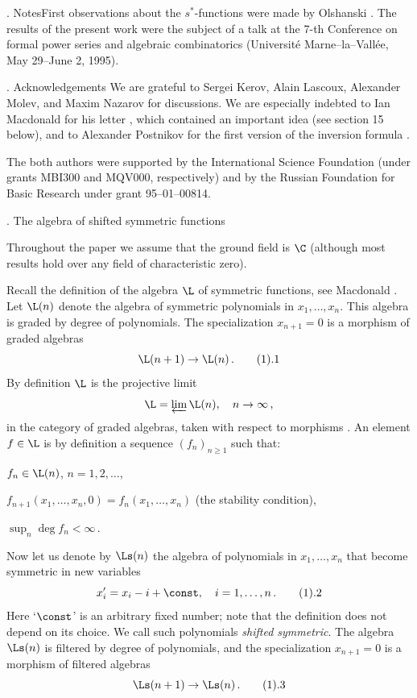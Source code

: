 . Notes\endsubhead  First observations about the
$s^*$-functions were made  by Olshanski \cite{O3}. The 
results of the present work were the
subject of a talk at the 7-th Conference on formal power series and
algebraic combinatorics (Universit\'e Marne--la--Vall\'ee, May 29--June 2,
1995).  

. Acknowledgements \endsubhead We are grateful to Sergei Kerov,
Alain Lascoux, Alexander Molev, and Maxim Nazarov for discussions. We are
especially indebted to Ian Macdonald for his letter \cite{M3}, which contained
an important idea (see section 15 below), and to Alexander Postnikov for
the first version of the inversion formula .

The both authors were supported by the International Science Foundation
(under grants MBI300 and MQV000, respectively) and by the Russian Foundation 
for Basic Research under grant 95--01--00814. 



. The algebra of shifted symmetric functions \endhead

Throughout the paper we assume that the ground field is $\C$ (although
most results hold over any field of characteristic zero).

Recall the definition of the algebra $\L$
of symmetric functions, see Macdonald \cite{M1}. Let $\L(n)$
denote the algebra of symmetric polynomials
in $x_1,\dots,x_n$. This algebra is graded
by degree of polynomials. The specialization
$x_{n+1}=0$ is a morphism of graded algebras
$$
\L(n+1)\to\L(n)\,.\tag1.1
$$
By definition $\L$ is the projective limit 
$$
\L=\varprojlim\L(n), \quad n\to\infty\,,
$$
in the category of graded algebras, taken with respect to morphisms 
. 
An element $f\in\L$ is by definition a
sequence $(f_n)_{n\ge1}$ such that:
\roster
\item $f_n\in\L(n)$, $n=1,2,\dots$,
\item $f_{n+1}(x_1,\dots,x_n,0)=f_{n}(x_1,\dots,x_n)$ 
(the stability condition),
\item $\sup_n\deg f_n<\infty$\,.
\endroster

Now let us denote by $\Ls(n)$ the algebra of polynomials in 
$x_1,\dots,x_n$ that become symmetric in new
variables
$$
x'_i=x_i-i+\const,\quad i=1,\dots,n \,. \tag1.2
$$
Here `$\const$' is an arbitrary fixed number;
note that the definition does not depend on
its choice. We call such polynomials
{\it shifted symmetric\/}. The algebra $\Ls(n)$
is filtered by degree of polynomials, and
the specialization 
$x_{n+1}=0$ is a morphism of filtered algebras
$$
\Ls(n+1)\to\Ls(n)\,.\tag1.3
$$

